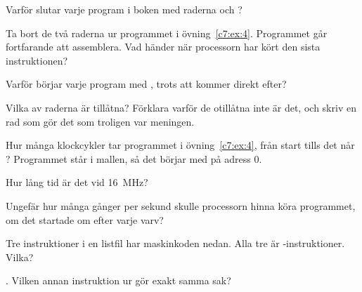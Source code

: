 \label{c7:ex:8}
\begin{parts}
  \item Varför slutar varje program i boken med raderna  och ?
  \item Ta bort de två raderna ur programmet i övning~\ref{c7:ex:4}. Programmet går fortfarande att
    assemblera. Vad händer när processorn har kört den sista instruktionen?
  \item Varför börjar varje program med , trots att  kommer direkt
    efter?
\end{parts}

\label{c7:ex:9}
Vilka av raderna är tillåtna? Förklara varför de otillåtna inte är det, och skriv en rad som gör
det som troligen var meningen.
\begin{parts}
  \item {}
  \item {}
  \item {}
  \item {}
  \item {}
\end{parts}

\label{c7:ex:10}
\begin{parts}
  \item Hur många klockcykler tar programmet i övning~\ref{c7:ex:4}, från start tills det når
    ? Programmet står i mallen, så det börjar med  på adress 0.
  \item Hur lång tid är det vid 16~MHz?
  \item Ungefär hur många gånger per sekund skulle processorn hinna köra programmet, om det startade
    om efter varje varv?
\end{parts}

\label{c7:ex:11}
Tre instruktioner i en listfil har maskinkoden nedan. Alla tre är -instruktioner. Vilka?
\begin{parts}
  \item {}
  \item {}
  \item {}. Vilken annan instruktion ur  gör exakt samma sak?
\end{parts}

